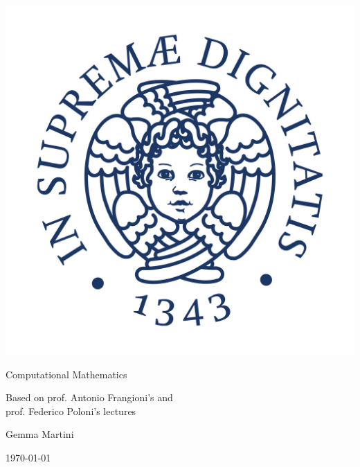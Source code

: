 \documentclass[preview,12pt]{article}
\begin{document}
\begin{titlepage}
\begin{center}
\vspace{3cm}

\Large

\vspace{2cm}

\includegraphics[scale=0.3]{pics/Cherubino.jpg}

\vspace{2.5cm}

{\Huge \sc Computational Mathematics}

\vspace{2cm}
Based on prof. Antonio Frangioni's and\\
  prof. Federico Poloni's lectures

\vspace{2cm}
Gemma Martini
\vfill

\today

\end{center}
\end{titlepage}

\shipout\null%
\newpage


\end{document}
